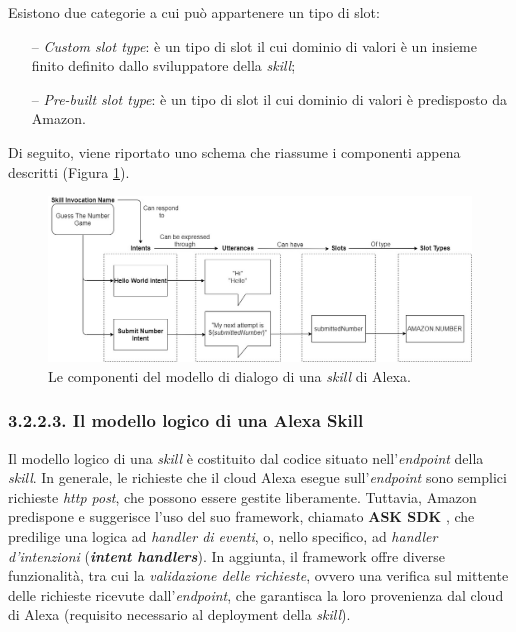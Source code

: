 Esistono due categorie a cui può appartenere un tipo di slot:
\begin{itemize}
  \item[--] \textit{Custom slot type}: è un tipo di slot il cui dominio di
        valori è un insieme finito definito dallo sviluppatore della
        \textit{skill};
  \item[--] \textit{Pre-built slot type}: è un tipo di slot il cui dominio di
        valori è predisposto da Amazon.
\end{itemize}

Di seguito, viene riportato uno schema che riassume i componenti appena
descritti (Figura \ref{fig:figure3.7}).
\begin{figure}[!ht]
  \centering
  \includegraphics[scale=0.41]{resources/images/other/alexa-skill-dialog-model.jpg}
  \caption{Le componenti del modello di dialogo di una \textit{skill} di Alexa.}
  \label{fig:figure3.7}
\end{figure}
\hfill

\subsubsection{3.2.2.3. Il modello logico di una Alexa Skill}
\label{subsec:Sezione3.2.2.3}

Il modello logico di una \textit{skill} è costituito dal codice situato
nell’\textit{endpoint} della \textit{skill}. In generale, le richieste che il
cloud Alexa esegue sull’\textit{endpoint} sono semplici richieste \textit{http
post}, che possono essere gestite liberamente. Tuttavia, Amazon predispone e
suggerisce l’uso del suo framework, chiamato \textbf{ASK SDK} \cite{ASK_SDK},
che predilige una logica ad \textit{handler di eventi}, o, nello specifico, ad
\textit{handler d'intenzioni} (\textit{\textbf{intent handlers}}). In aggiunta,
il framework offre diverse funzionalità, tra cui la \textit{validazione delle
richieste}, ovvero una verifica sul mittente delle richieste ricevute
dall’\textit{endpoint}, che garantisca la loro provenienza dal cloud di Alexa
(requisito necessario al deployment della \textit{skill}).

